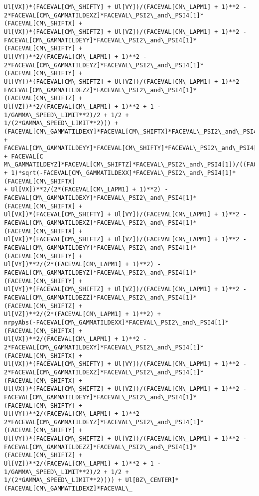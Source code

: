 \documentclass[landscape,letterpaper,10pt,english]{article}
\begin{document}
\begin{Verbatim}[commandchars=\\\{\}]
Ul[VX])*(FACEVAL[CM\_SHIFTY] + Ul[VY])/(FACEVAL[CM\_LAPM1] + 1)**2 -
2*FACEVAL[CM\_GAMMATILDEXZ]*FACEVAL\_PSI2\_and\_PSI4[1]*(FACEVAL[CM\_SHIFTX] +
Ul[VX])*(FACEVAL[CM\_SHIFTZ] + Ul[VZ])/(FACEVAL[CM\_LAPM1] + 1)**2 -
FACEVAL[CM\_GAMMATILDEYY]*FACEVAL\_PSI2\_and\_PSI4[1]*(FACEVAL[CM\_SHIFTY] +
Ul[VY])**2/(FACEVAL[CM\_LAPM1] + 1)**2 -
2*FACEVAL[CM\_GAMMATILDEYZ]*FACEVAL\_PSI2\_and\_PSI4[1]*(FACEVAL[CM\_SHIFTY] +
Ul[VY])*(FACEVAL[CM\_SHIFTZ] + Ul[VZ])/(FACEVAL[CM\_LAPM1] + 1)**2 -
FACEVAL[CM\_GAMMATILDEZZ]*FACEVAL\_PSI2\_and\_PSI4[1]*(FACEVAL[CM\_SHIFTZ] +
Ul[VZ])**2/(FACEVAL[CM\_LAPM1] + 1)**2 + 1 - 1/GAMMA\_SPEED\_LIMIT**2)/2 + 1/2 +
1/(2*GAMMA\_SPEED\_LIMIT**2))) +
(FACEVAL[CM\_GAMMATILDEXY]*FACEVAL[CM\_SHIFTX]*FACEVAL\_PSI2\_and\_PSI4[1] +
FACEVAL[CM\_GAMMATILDEYY]*FACEVAL[CM\_SHIFTY]*FACEVAL\_PSI2\_and\_PSI4[1] + FACEVAL[C
M\_GAMMATILDEYZ]*FACEVAL[CM\_SHIFTZ]*FACEVAL\_PSI2\_and\_PSI4[1])/((FACEVAL[CM\_LAPM1]
+ 1)*sqrt(-FACEVAL[CM\_GAMMATILDEXX]*FACEVAL\_PSI2\_and\_PSI4[1]*(FACEVAL[CM\_SHIFTX]
+ Ul[VX])**2/(2*(FACEVAL[CM\_LAPM1] + 1)**2) -
FACEVAL[CM\_GAMMATILDEXY]*FACEVAL\_PSI2\_and\_PSI4[1]*(FACEVAL[CM\_SHIFTX] +
Ul[VX])*(FACEVAL[CM\_SHIFTY] + Ul[VY])/(FACEVAL[CM\_LAPM1] + 1)**2 -
FACEVAL[CM\_GAMMATILDEXZ]*FACEVAL\_PSI2\_and\_PSI4[1]*(FACEVAL[CM\_SHIFTX] +
Ul[VX])*(FACEVAL[CM\_SHIFTZ] + Ul[VZ])/(FACEVAL[CM\_LAPM1] + 1)**2 -
FACEVAL[CM\_GAMMATILDEYY]*FACEVAL\_PSI2\_and\_PSI4[1]*(FACEVAL[CM\_SHIFTY] +
Ul[VY])**2/(2*(FACEVAL[CM\_LAPM1] + 1)**2) -
FACEVAL[CM\_GAMMATILDEYZ]*FACEVAL\_PSI2\_and\_PSI4[1]*(FACEVAL[CM\_SHIFTY] +
Ul[VY])*(FACEVAL[CM\_SHIFTZ] + Ul[VZ])/(FACEVAL[CM\_LAPM1] + 1)**2 -
FACEVAL[CM\_GAMMATILDEZZ]*FACEVAL\_PSI2\_and\_PSI4[1]*(FACEVAL[CM\_SHIFTZ] +
Ul[VZ])**2/(2*(FACEVAL[CM\_LAPM1] + 1)**2) +
nrpyAbs(-FACEVAL[CM\_GAMMATILDEXX]*FACEVAL\_PSI2\_and\_PSI4[1]*(FACEVAL[CM\_SHIFTX] +
Ul[VX])**2/(FACEVAL[CM\_LAPM1] + 1)**2 -
2*FACEVAL[CM\_GAMMATILDEXY]*FACEVAL\_PSI2\_and\_PSI4[1]*(FACEVAL[CM\_SHIFTX] +
Ul[VX])*(FACEVAL[CM\_SHIFTY] + Ul[VY])/(FACEVAL[CM\_LAPM1] + 1)**2 -
2*FACEVAL[CM\_GAMMATILDEXZ]*FACEVAL\_PSI2\_and\_PSI4[1]*(FACEVAL[CM\_SHIFTX] +
Ul[VX])*(FACEVAL[CM\_SHIFTZ] + Ul[VZ])/(FACEVAL[CM\_LAPM1] + 1)**2 -
FACEVAL[CM\_GAMMATILDEYY]*FACEVAL\_PSI2\_and\_PSI4[1]*(FACEVAL[CM\_SHIFTY] +
Ul[VY])**2/(FACEVAL[CM\_LAPM1] + 1)**2 -
2*FACEVAL[CM\_GAMMATILDEYZ]*FACEVAL\_PSI2\_and\_PSI4[1]*(FACEVAL[CM\_SHIFTY] +
Ul[VY])*(FACEVAL[CM\_SHIFTZ] + Ul[VZ])/(FACEVAL[CM\_LAPM1] + 1)**2 -
FACEVAL[CM\_GAMMATILDEZZ]*FACEVAL\_PSI2\_and\_PSI4[1]*(FACEVAL[CM\_SHIFTZ] +
Ul[VZ])**2/(FACEVAL[CM\_LAPM1] + 1)**2 + 1 - 1/GAMMA\_SPEED\_LIMIT**2)/2 + 1/2 +
1/(2*GAMMA\_SPEED\_LIMIT**2)))) + Ul[BZ\_CENTER]*(FACEVAL[CM\_GAMMATILDEXZ]*FACEVAL\_

\end{Verbatim}
\end{document}
